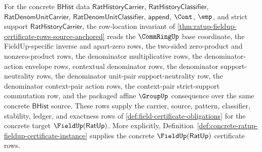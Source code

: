 \begin{theorem}
\label{thm:ratup-fieldup-semantic-certificate-assembly}
For the concrete $\mathsf{BHist}$ data
$\mathsf{RatHistoryCarrier}$, $\mathsf{RatHistoryClassifier}$,
$\mathsf{RatDenomUnitCarrier}$, $\mathsf{RatDenomUnitClassifier}$,
$\mathsf{append}$, $\Cont$, $\emp$, and strict support
$\mathsf{RatHistoryCarrier}$, the row-location invariant of
\autoref{thm:ratup-fieldup-certificate-rows-source-anchored} reads the
$\CommRingUp$ base coordinate, the FieldUp-specific inverse and apart-zero rows,
the two-sided zero-product and nonzero-product rows, the denominator
multiplicative rows, the denominator-action envelope rows, contextual
denominator rows, the denominator support-neutrality rows, the denominator
unit-pair support-neutrality row, the denominator context-pair action rows, the
context-pair strict-support commutation row, and
the packaged affine $\GroupUp$ consequence over the same concrete
$\mathsf{BHist}$ source. These rows supply the carrier, source, pattern,
classifier, stability, ledger, and exactness rows of
\autoref{def:field-certificate-obligations} for the concrete target
$\FieldUp(\mathsf{RatUp})$. More explicitly,
Definition~\ref{def:concrete-ratup-fieldup-certificate-instance} supplies the
concrete $\FieldUp(\mathsf{RatUp})$ certificate rows.
\end{theorem}
